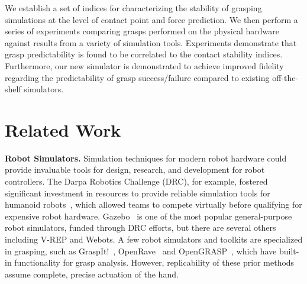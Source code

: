 We establish a set of indices for characterizing the stability of grasping simulations at the level of contact point and force prediction.  We then perform a series of experiments comparing grasps performed on the physical hardware against results from a variety of simulation tools. Experiments demonstrate that grasp predictability is found to be correlated to the contact stability indices.  Furthermore, our new simulator is demonstrated to achieve improved fidelity regarding the predictability of grasp success/failure compared to existing off-the-shelf simulators.  



\section{Related Work}
\label{relwork}


{\bf Robot Simulators.}
Simulation techniques for modern robot hardware could provide invaluable tools for design, research, and development for robot controllers.  The Darpa Robotics Challenge (DRC), for example, fostered significant investment in resources to provide reliable simulation tools for humanoid robots~\cite{Hsu14}, which allowed teams to compete virtually before qualifying for expensive robot hardware.  Gazebo~\cite{koenig2004design} is one of the most popular general-purpose robot simulators, funded through DRC efforts, but there are several others including V-REP and Webots.  A few robot simulators and toolkits are specialized in grasping, such as GraspIt!~\cite{Miller04}, OpenRave~\cite{Diankov08OpenRAVE} and OpenGRASP~\cite{Leon10OpenGRASP}, which have built-in functionality for grasp analysis. However, replicability of these prior methods assume complete, precise actuation of the hand.


